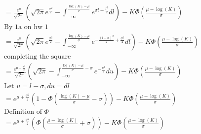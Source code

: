 \documentclass[12pt, letterpaper]{article}
\begin{document}
\begin{enumerate}
\begin{enumerate}
\begin{align*}
		&= \frac{e^\mu}{\sqrt{2 \pi}} ( \sqrt{2\pi}e^{\frac{\sigma^2}{2}} - \int_{-\infty}^{\frac{\log(K) - \mu}{\sigma}} e^{\sigma l - \frac{l^2}{2}} dl) - K\Phi(\frac{\mu - \log(K)}{\sigma})\\ & \text{By 1a on hw 1}\\
		&= \frac{e^\mu}{\sqrt{2 \pi}} ( \sqrt{2\pi}e^{\frac{\sigma^2}{2}} - \int_{-\infty}^{\frac{\log(K) - \mu}{\sigma}} e^{-\frac{(l-\sigma)^2}{2}+\frac{\sigma^2}{2}} dl) - K\Phi(\frac{\mu - \log(K)}{\sigma})\\
		& \text{completing the square}\\
		&= \frac{e^{\mu + \frac{\sigma^2}{2}}}{\sqrt{2 \pi}} ( \sqrt{2\pi} - \int_{-\infty}^{\frac{\log(K) - \mu}{\sigma}  - \sigma} e^{-\frac{u^2}{2}} du) 
- K\Phi(\frac{\mu - \log(K)}{\sigma})\\
	& \text{Let } u = l - \sigma, du = dl\\
	&= e^{\mu + \frac{\sigma^2}{2}}(1-\Phi(\frac{\log(K) - \mu}{\sigma}  - \sigma))- K\Phi(\frac{\mu - \log(K)}{\sigma})\\
	& \text{Definition of } \Phi\\
	&= e^{\mu + \frac{\sigma^2}{2}}(\Phi(\frac{\mu -\log(K)}{\sigma}  + \sigma))- K\Phi(\frac{\mu - \log(K)}{\sigma})\\
		\end{align*}
	\end{enumerate}
\end{enumerate}
\end{document}
